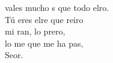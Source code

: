 \begin{cancion}%
	 vales mucho s que todo elro. \\
	Tú eres elre que reiro\\
	mi ran, lo prero, \\
	lo me que me ha pas,\\
	Seor.\\
\end{cancion}%

